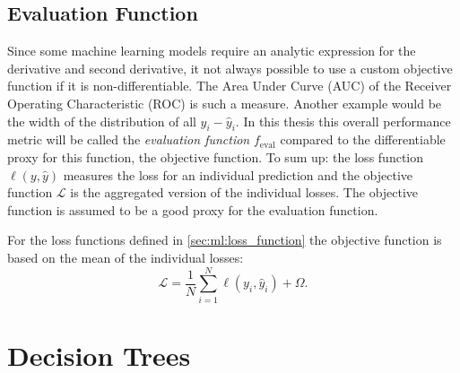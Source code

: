 \subsection{Evaluation Function}
Since some machine learning models require an analytic expression for the derivative and second derivative, it not always possible to use a custom objective function if it is non-differentiable. The Area Under Curve (AUC) of the Receiver Operating Characteristic (ROC) is such a measure. Another example would be the width of the distribution of all $y_i-\hat{y}_i$. In this thesis this overall performance metric will be called the \emph{evaluation function} $f_\mathrm{eval}$ compared to the differentiable proxy for this function, the objective function. To sum up: the loss function $\ell(y, \hat{y})$ measures the loss for an individual prediction and the objective function $\mathcal{L}$ is the aggregated version of the individual losses. The objective function is assumed to be a good proxy for the evaluation function. 

For the loss functions defined in \autoref{sec:ml:loss_function} the objective function is based on the mean of the individual losses:
\begin{equation}
  \mathcal{L} = \frac{1}{N} \sum_{i=1}^N \ell(y_i, \hat{y}_i) + \Omega. 
\end{equation}

\section{Decision Trees}
\label{sec:ml:decision_trees}

